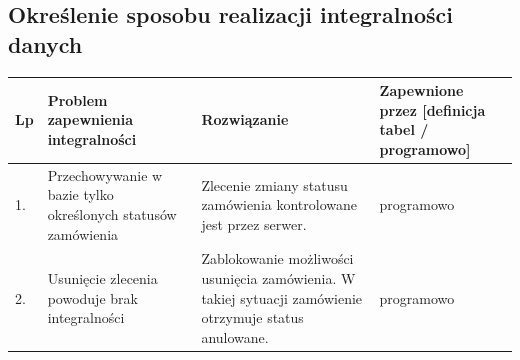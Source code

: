 \documentclass[10pt,a4paper]{article}
\begin{document}
\subsection{Określenie sposobu realizacji integralności danych}
  \flushleft
  \begin{longtable}{| p{0.5cm} | p{4cm} | p{6cm} | p{2cm} |}
  \hline
  Lp & Problem zapewnienia integralności &           Rozwiązanie                 & Zapewnione przez
  																	               [definicja tabel 
  																	               / programowo]\\ \hline
  1. & Przechowywanie w bazie tylko
       określonych statusów zamówienia   &  Zlecenie zmiany statusu zamówienia
         									kontrolowane jest przez serwer.		 & programowo\\ \hline
  2. & Usunięcie zlecenia powoduje
  	   brak integralności				 &  Zablokowanie możliwości usunięcia
  	   										zamówienia. W takiej sytuacji
  	   										zamówienie otrzymuje 
  	   										status anulowane. 					 & programowo\\ \hline
  	   										

\end{longtable}
\end{document}

